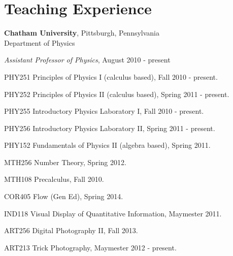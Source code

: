 \section{\sc Teaching Experience} %

{\bf Chatham University}, Pittsburgh, Pennsylvania\\
Department of Physics
\vspace{1mm}
\begin{list1}
\item[] {\em Assistant Professor of Physics}, August 2010 - present
\vspace*{2mm}  
\begin{list2}
\item[\fcscore{4}] PHY251 Principles of Physics I (calculus based),  Fall 2010 - present.
\item[\fcscore{4}] PHY252 Principles of Physics II (calculus based),  Spring 2011 - present.
\item[\fcscore{4}] PHY255 Introductory Physics Laboratory I,  Fall 2010 - present.
\item[\fcscore{4}] PHY256 Introductory Physics Laboratory II,  Spring 2011 - present.
\item[\fcscore{1}] PHY152 Fundamentals of Physics II (algebra based),  Spring 2011.
\item[\fcscore{1}] MTH256 Number Theory, Spring 2012.
\item[\fcscore{1}] MTH108 Precalculus, Fall 2010.
\item[\fcscore{1}] COR405 Flow (Gen Ed), Spring 2014.
\item[\fcscore{1}] IND118 Visual Display of Quantitative Information, Maymester 2011.
\item[\fcscore{1}] ART256 Digital Photography II, Fall 2013.
\item[\fcscore{3}] ART213 Trick Photography, Maymester 2012 - present.
\end{list2}

\end{list1}



